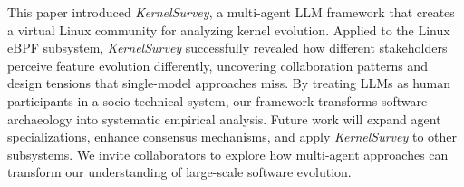 \documentclass[sigconf,review,anonymous]{acmart}
\newcommand{\sys}{\textit{KernelSurvey}\xspace}
\begin{document}
This paper introduced \sys, a multi-agent LLM framework that creates a virtual Linux community for analyzing kernel evolution. Applied to the Linux eBPF subsystem, \sys successfully revealed how different stakeholders perceive feature evolution differently, uncovering collaboration patterns and design tensions that single-model approaches miss. By treating LLMs as human participants in a socio-technical system, our framework transforms software archaeology into systematic empirical analysis. Future work will expand agent specializations, enhance consensus mechanisms, and apply \sys to other subsystems. We invite collaborators to explore how multi-agent approaches can transform our understanding of large-scale software evolution.


    
\end{document}
